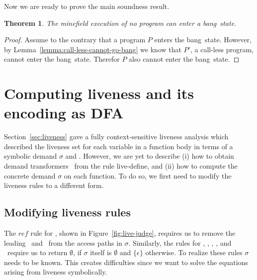 \documentclass[preprint, 9pt]{sigplanconf}
\newcommand{\warning}[1]{{\color{Myred}{#1}}}
\newcommand{\bang}{\mbox{\sc bang}}
\newtheorem{theorem}{Theorem}[section]
\begin{document}
Now we are ready to prove the main soundness result.

\begin{theorem}
The  minefield  execution of  no  program  can enter  a
\bang\ state.
\end{theorem}
 
\begin{proof}
Assume to  the contrary that  a program $P$  enters the
\bang\  state.  \warning{We can  transform  $P$  to a  call-less
program $P'$ such that  the minefield executions of $P$
and $P'$  are identical  except for change  of variable
names. }             However,                 by
Lemma~\ref{lemma:call-less-cannot-go-bang} we know that
$P'$,   a   call-less   program,   cannot   enter   the
\bang\  state.  Therefor  $P$  also  cannot  enter  the
\bang\ state.
\end{proof}
 




\section{Computing liveness and its encoding as DFA}\label{sec:computing}
Section~\ref{sec:liveness}  gave   a  fully context-sensitive
liveness analysis which 
described the  liveness set for  each variable  in a function  body in
terms of  a symbolic demand  $\sigma$ and \Lfonly.  However,  we are yet
to describe  (i) how to obtain demand  transformers \Lfonly\ from
the  rule {\sc  live-define}, and  (ii)  how to  compute the  concrete
demand $\sigma$  on each function.   To do so,  we first need to  modify the
liveness rules to a different form.

\subsection{Modifying liveness rules}

The   $\mathit{ref}$   rule   for   \CONS,   shown   in
Figure~\ref{fig:live-judge}, requires us  to remove the
leading  \acar\ and  \acdr\  from the  access paths  in
$\sigma$.  Similarly, the rules  for \CAR, \CDR, \PRIM,
\NULLQ, and \SIF\ require  us to return $\emptyset$, if
$\sigma$      itself       is      $\emptyset$      and
$\lbrace\epsilon\rbrace$  otherwise.  To  realize these
rules  $\sigma$   needs  to  be  known.   This  creates
difficulties  since  we  want to  solve  the  equations
arising from liveness symbolically.
\end{document}
